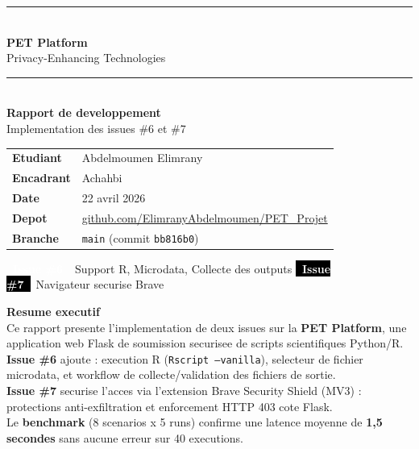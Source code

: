 \documentclass[12pt,a4paper]{article}
\begin{document}
\begin{titlepage}
\thispagestyle{empty}
\vspace*{3cm}
\begin{center}
  {\color{myblue}\rule{\linewidth}{2pt}}\\[0.5cm]
  {\Huge\bfseries PET Platform}\\[0.3cm]
  {\large\color{mygray} Privacy-Enhancing Technologies}\\[0.2cm]
  {\color{myblue}\rule{\linewidth}{2pt}}\\[1.5cm]

  {\LARGE\bfseries Rapport de developpement}\\[0.4cm]
  {\large Implementation des issues \#6 et \#7}\\[2cm]

  \begin{tabular}{ll}
    \textbf{Etudiant}  & Abdelmoumen Elimrany \\[4pt]
    \textbf{Encadrant} & Achahbi \\[4pt]
    \textbf{Date}      & 22 avril 2026 \\[4pt]
    \textbf{Depot}     & \url{github.com/ElimranyAbdelmoumen/PET\_Projet} \\[4pt]
    \textbf{Branche}   & \texttt{main} (commit \texttt{bb816b0}) \\
  \end{tabular}
\end{center}
\vfill
\begin{center}
  \colorbox{myblue}{\textcolor{white}{\textbf{~Issue \#6~}}}~Support R, Microdata, Collecte des outputs
  \quad
  \colorbox{black}{\textcolor{white}{\textbf{~Issue \#7~}}}~Navigateur securise Brave
\end{center}
\end{titlepage}

\newpage
\thispagestyle{fancy}

\noindent\colorbox{mylight}{%
  \begin{minipage}{\linewidth}
    \vspace{8pt}
    \textbf{\large Resume executif}\\[6pt]
    Ce rapport presente l'implementation de deux issues sur la \textbf{PET Platform},
    une application web Flask de soumission securisee de scripts scientifiques Python/R.\\[4pt]
    \textbf{Issue \#6} ajoute : execution R (\texttt{Rscript --vanilla}), selecteur de fichier
    microdata, et workflow de collecte/validation des fichiers de sortie.\\[4pt]
    \textbf{Issue \#7} securise l'acces via l'extension Brave Security Shield (MV3) :
    protections anti-exfiltration et enforcement HTTP 403 cote Flask.\\[4pt]
    Le \textbf{benchmark} (8 scenarios x 5 runs) confirme une latence moyenne de
    \textbf{1,5 secondes} sans aucune erreur sur 40 executions.
    \vspace{8pt}
  \end{minipage}%
}
\end{document}
